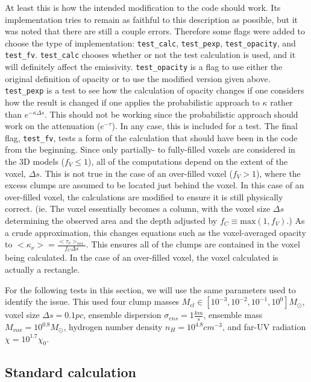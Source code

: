 \documentclass[a4paper]{article}
\begin{document}
    At least this is how the intended modification to the code should work.
    Its implementation tries to remain as faithful to this description as possible, but it was noted that there are still a couple errors.
    Therefore some flags were added to choose the type of implementation: \texttt{test\_calc}, \texttt{test\_pexp}, \texttt{test\_opacity}, and \texttt{test\_fv}.
    \texttt{test\_calc} chooses whether or not the test calculation is used, and it will definitely affect the emissivity.
    \texttt{test\_opacity} is a flag to use either the original definition of opacity or to use the modified version given above.
    \texttt{test\_pexp} is a test to see how the calculation of opacity changes if one considers how the result is changed if one applies the probabilistic approach to \(\kappa\) rather than \(e^{-\kappa \Delta s}\).
    This should not be working since the probabilistic approach should work on the attenuation (\(e^{-\tau}\)).
    In any case, this is included for a test.
    The final flag, \texttt{test\_fv}, tests a form of the calculation that should have been in the code from the beginning.
    Since only partially- to fully-filled voxels are considered in the 3D models (\(f_V \leq 1\)), all of the computations depend on the extent of the voxel, \(\Delta s\).
    This is not true in the case of an over-filled voxel (\(f_V > 1\)), where the excess clumps are assumed to be located just behind the voxel.
    In this case of an over-filled voxel, the calculations are modified to ensure it is still physically correct.
    (ie. The voxel essentially becomes a column, with the voxel size \(\Delta s\) determining the observed area and the depth adjusted by \(f_C \equiv \mathrm{max}(1, f_V)\).)
    As a crude approximation, this changes equations such as the voxel-averaged opacity to \(<\kappa_\nu> = \frac{<\tau_\nu>_{vox}}{f_C \Delta s}\).
    This ensures all of the clumps are contained in the voxel being calculated.
    In the case of an over-filled voxel, the voxel calculated is actually a rectangle.

    For the following tests in this section, we will use the same parameters used to identify the issue.
    This used four clump masses \(M_{cl} \in [10^{-3}, 10^{-2}, 10^{-1}, 10^{0}] M_\odot\),
    voxel size \(\Delta s = 0.1 pc\),
    ensemble dispersion \(\sigma_{ens} = 1 \frac{km}{s}\),
    ensemble mass \(M_{vox} = 10^{0.8} M_\odot\),
    hydrogen number density \(n_H = 10^{4.8} cm^{-3}\),
    and far-UV radiation \(\chi = 10^{1.7} \chi_0\).

    \subsection{Standard calculation}
\end{document}
